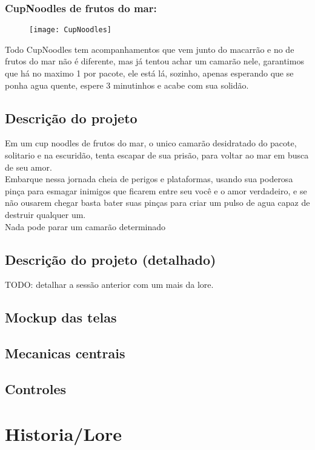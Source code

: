         \subsubsection{CupNoodles de frutos do mar:}
            \begin{figure}[H]
                \texttt{[image: CupNoodles]}
            \centering
            \end{figure}
            
            Todo CupNoodles tem acompanhamentos que vem junto do macarrão e no de frutos do mar não é diferente, mas já tentou achar um camarão nele, garantimos que há no maximo 1 por pacote, ele está lá, sozinho, apenas esperando que se ponha agua quente, espere 3 minutinhos e acabe com sua solidão.

    \subsection{Descrição do projeto}%
Em um cup noodles de frutos do mar, o unico camarão desidratado do pacote, solitario e na escuridão, tenta escapar de sua prisão, para voltar ao mar em busca de seu amor.\\
Embarque nessa jornada cheia de perigos e plataformas, usando sua poderosa pinça para esmagar inimigos que ficarem entre seu você e o amor verdadeiro, e se não ousarem chegar basta bater suas pinças para criar um pulso de agua capaz de destruir qualquer um.\\
Nada pode parar um camarão determinado\\


    \subsection{Descrição do projeto (detalhado)}%
TODO: detalhar a sessão anterior com um mais da lore.\\
    \subsection{Mockup das telas}%
    \subsection{Mecanicas centrais}%
    \subsection{Controles}%
    
\section{Historia/Lore}%
